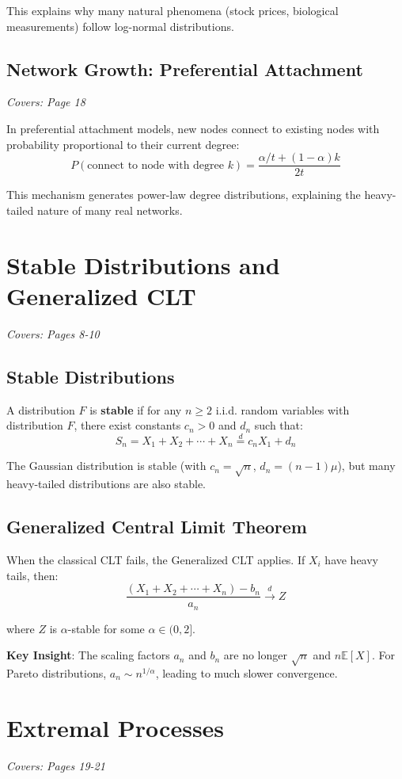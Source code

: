 \documentclass[11pt]{article}
\begin{document}
This explains why many natural phenomena (stock prices, biological measurements) follow log-normal distributions.

\subsection{Network Growth: Preferential Attachment}
\textit{Covers: Page 18}

In preferential attachment models, new nodes connect to existing nodes with probability proportional to their current degree:
$$P(\text{connect to node with degree } k) = \frac{\alpha/t + (1-\alpha)k}{2t}$$

This mechanism generates power-law degree distributions, explaining the heavy-tailed nature of many real networks.

\section{Stable Distributions and Generalized CLT}
\textit{Covers: Pages 8-10}

\subsection{Stable Distributions}
A distribution $F$ is \textbf{stable} if for any $n \geq 2$ i.i.d. random variables with distribution $F$, there exist constants $c_n > 0$ and $d_n$ such that:
$$S_n = X_1 + X_2 + \cdots + X_n \stackrel{d}{=} c_n X_1 + d_n$$

The Gaussian distribution is stable (with $c_n = \sqrt{n}$, $d_n = (n-1)\mu$), but many heavy-tailed distributions are also stable.

\subsection{Generalized Central Limit Theorem}
When the classical CLT fails, the Generalized CLT applies. If $X_i$ have heavy tails, then:
$$\frac{(X_1 + X_2 + \cdots + X_n) - b_n}{a_n} \xrightarrow{d} Z$$

where $Z$ is $\alpha$-stable for some $\alpha \in (0, 2]$.

\textbf{Key Insight}: The scaling factors $a_n$ and $b_n$ are no longer $\sqrt{n}$ and $n\mathbb{E}[X]$. For Pareto distributions, $a_n \sim n^{1/\alpha}$, leading to much slower convergence.

\section{Extremal Processes}
\textit{Covers: Pages 19-21}
\end{document}
